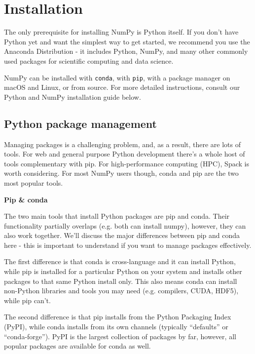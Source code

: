 \section{Installation}

The only prerequisite for installing NumPy is Python itself. If you don’t have Python
yet and want the simplest way to get started, we recommend you use the Anaconda
Distribution - it includes Python, NumPy, and many other commonly used packages
for scientific computing and data science.

NumPy can be installed with \texttt{conda}, with \texttt{pip}, with a package
manager on macOS and Linux, or from source. For more detailed instructions, consult
our Python and NumPy installation guide below.

\subsection{Python package management}
Managing packages is a challenging problem, and, as a result, there are lots of
tools. For web and general purpose Python development there’s a whole host of tools
complementary with pip. For high-performance computing (HPC), Spack is worth considering.
For most NumPy users though, conda and pip are the two most popular tools.

\textbf{Pip \& conda}

\bigskip

The two main tools that install Python packages are pip and conda. Their functionality
partially overlaps (e.g. both can install numpy), however, they can also work
together. We’ll discuss the major differences between pip and conda here - this is
important to understand if you want to manage packages effectively.

\bigskip

The first difference is that conda is cross-language and it can install Python, while
pip is installed for a particular Python on your system and installs other packages
to that same Python install only. This also means conda can install non-Python
libraries and tools you may need (e.g. compilers, CUDA, HDF5), while pip can’t.

\bigskip

The second difference is that pip installs from the Python Packaging Index (PyPI),
while conda installs from its own channels (typically “defaults” or “conda-forge”).
PyPI is the largest collection of packages by far, however, all popular packages
are available for conda as well.

